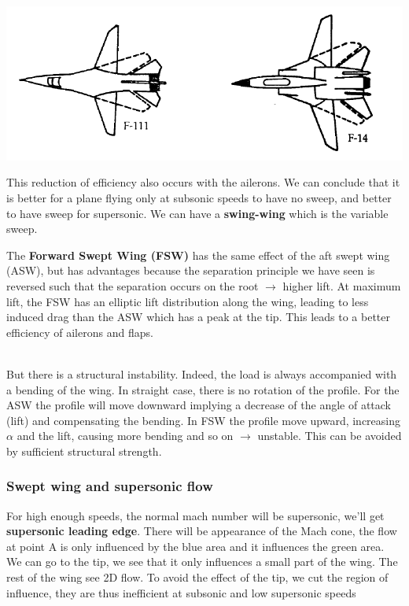 \begin{center}
\begin{minipage}{0.25\textwidth}
	\label{ch7/12}
	\end{minipage}
	\begin{minipage}{0.3\textwidth}
	\includegraphics[scale=0.36]{ch7/13}
	\label{ch7/13}
	\end{minipage}
	\end{center}		
	
	This reduction of efficiency also occurs with the ailerons. We can conclude that it is better for a plane flying only at subsonic speeds to have no sweep, and better to have sweep for supersonic. We can have a \textbf{swing-wing} which is the variable sweep. 
	
	The \textbf{Forward Swept Wing (FSW)} has the same effect of the aft swept wing (ASW), but has advantages because the separation principle we have seen is reversed such that the separation occurs on the root $\rightarrow$ higher lift. At maximum lift, the FSW has an elliptic lift distribution along the wing, leading to less induced drag than the ASW which has a peak at the tip. This leads to a better efficiency of ailerons and flaps. 
	
	\ \\
	
	But there is a structural instability. Indeed, the load is always accompanied with a bending of the wing. In straight case, there is no rotation of the profile. For the ASW the profile will move downward implying a decrease of the angle of attack (lift) and compensating the bending. In FSW the profile move upward, increasing $\alpha$ and the lift, causing more bending and so on $\rightarrow$ unstable. This can be avoided by sufficient structural strength. 
	
\subsubsection{Swept wing and supersonic flow}
	For high enough speeds, the normal mach number will be supersonic, we'll get \textbf{supersonic leading edge}. There will be appearance of the Mach cone, the flow at point A is only influenced by the blue area and it influences the green area. We can go to the tip, we see that it only influences a small part of the wing. The rest of the wing see 2D flow. To avoid the effect of the tip, we cut the region of influence, they are thus inefficient at subsonic and low supersonic speeds
	
